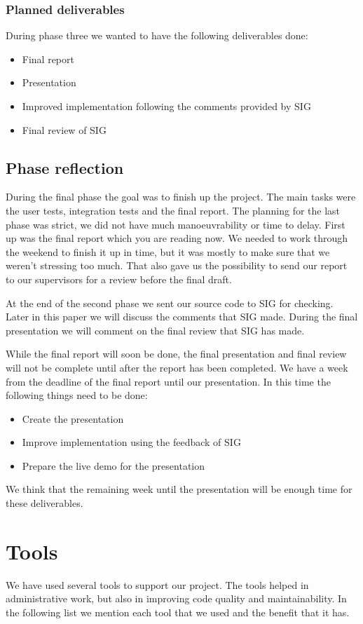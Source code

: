 \subsubsection{Planned deliverables}
During phase three we wanted to have the following deliverables done:
\begin{itemize}
\item Final report
\item Presentation
\item Improved implementation following the comments provided by SIG
\item Final review of SIG
\end{itemize}

\subsection{Phase reflection}
During the final phase the goal was to finish up the project.
The main tasks were the user tests, integration tests and the final report.
The planning for the last phase was strict, we did not have much manoeuvrability or time to delay.
First up was the final report which you are reading now.
We needed to work through the weekend to finish it up in time, but it was mostly to make sure that we weren't stressing too much.
That also gave us the possibility to send our report to our supervisors for a review before the final draft.

At the end of the second phase we sent our source code to SIG for checking.
Later in this paper we will discuss the comments that SIG made.
During the final presentation we will comment on the final review that SIG has made.

While the final report will soon be done, the final presentation and final review will not be complete until after the report has been completed.
We have a week from the deadline of the final report until our presentation.
In this time the following things need to be done:
\begin{itemize}
\item Create the presentation
\item Improve implementation using the feedback of SIG
\item Prepare the live demo for the presentation
\end{itemize}
We think that the remaining week until the presentation will be enough time for these deliverables.

\section{Tools}
We have used several tools to support our project.
The tools helped in administrative work, but also in improving code quality and maintainability.
In the following list we mention each tool that we used and the benefit that it has.

